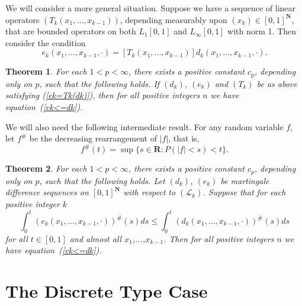 \documentclass[12pt]{amsart}
\newtheorem{thm}{Theorem}
\begin{document}
We will consider a more general situation.  Suppose we have a
sequence of linear operators $(T_k(x_1,...,x_{k-1}))$, 
depending measurably upon $(x_k) \in [0,1]^{\mathbf{N}}$,
that are bounded operators on both 
$L_1[0,1]$ and $L_\infty [0,1]$ with norm 1.  Then consider the
condition
\begin{equation}
\label{ek=Tk(dk)}
e_k(x_1,...,x_{k-1}, \cdot
)=[T_k(x_1,...,x_{k-1})]d_k(x_1,...,x_{k-1}, \cdot ).
\end{equation}

\begin{thm}
\label{t ek<=dk T}
For each $1<p<\infty$, there exists a positive constant $c_p$, 
depending only on $p$, such
that the following holds.
If $(d_k)$, $(e_k)$ and $(T_k)$ be as above satisfying (\ref{ek=Tk(dk)}),
then for all positive integers $n$ we have
equation~(\ref{ek<=dk}).
\end{thm}

We will also need the following intermediate result.
For any random variable $f$, 
let $f^{\#}$ be the decreasing rearrangement of $|f|$, that is,
\[f^{\#}(t)=\sup\{ s\in \mathbf{R}: P(|f|<s)<t\}.\]

\begin{thm}
\label{t ek<=dk sharp}
For each $1<p<\infty$, there exists a positive constant $c_p$, 
depending only on $p$, such
that the following holds.
Let $(d_k)$, $(e_k)$ be martingale difference sequences on
$[0,1]^\mathbf{N}$ with respect to $(\mathcal{L}_k)$. 
Suppose that for each positive integer $k$
\[\int_0^t (e_k(x_1,...,x_{k-1},\cdot))^{\#}(s)ds 
\leq \int_0^t  (d_k(x_1,...,x_{k-1},\cdot))^{\#}(s)ds\]
for all $t\in [0,1]$ and almost all $x_1$,...,$x_{k-1}$.
Then for all positive integers $n$ we have
equation~(\ref{ek<=dk}).
\end{thm}

\section{The Discrete Type Case}
\end{document}
